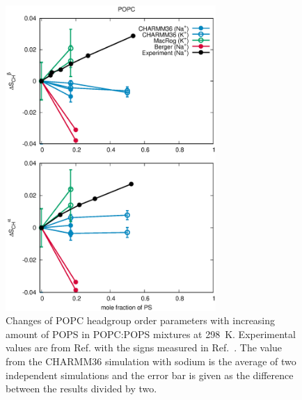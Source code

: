 \documentclass[aps,prl,superscriptaddress,twocolumn]{revtex4}
\begin{document}
\begin{figure}[!tb]
  \centering
  \includegraphics[width=8.0cm]{../Figs/HGorderparametersPCvsPS.eps}
  \caption{\label{HGorderparametersPCvsPS}
    Changes of POPC headgroup order parameters with increasing amount of POPS in POPC:POPS mixtures at 298~K.
    Experimental values are from Ref.  with the signs measured in Ref.~.
    The value from the CHARMM36 simulation with sodium is the average of two independent simulations and
    the error bar is given as the difference between the results divided by two.
  }
\end{figure}
\end{document}
